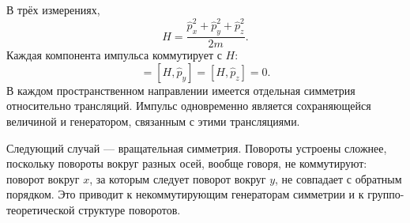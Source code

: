 В трёх измерениях,
\begin{equation}
H
=
\frac{\hat p_x^2+\hat p_y^2+\hat p_z^2}{2m}.
\end{equation}
Каждая компонента импульса коммутирует с \(H\):
\begin{equation}
[H,\hat p_x]=[H,\hat p_y]=[H,\hat p_z]=0.
\end{equation}
В каждом пространственном направлении имеется отдельная симметрия относительно трансляций. Импульс одновременно является сохраняющейся величиной и генератором, связанным с этими трансляциями.

Следующий случай — вращательная симметрия. Повороты устроены сложнее, поскольку повороты вокруг разных осей, вообще говоря, не коммутируют: поворот вокруг \(x\), за которым следует поворот вокруг \(y\), не совпадает с обратным порядком. Это приводит к некоммутирующим генераторам симметрии и к группо-теоретической структуре поворотов.
